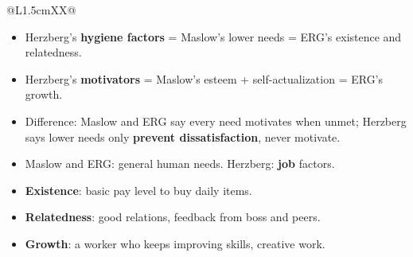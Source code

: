 {{\begin{tabularx}{\linewidth}{@{}L{1.5cm}XX@{}}
\bottomrule
\end{tabularx}}
\vspace{3pt}
\begin{itemize}
  \item Herzberg's \textbf{hygiene factors} = Maslow's lower needs = ERG's existence and
    relatedness.
  \item Herzberg's \textbf{motivators} = Maslow's esteem + self-actualization = ERG's growth.
  \item Difference: Maslow and ERG say every need motivates when unmet; Herzberg says lower
    needs only \textbf{prevent dissatisfaction}, never motivate.
  \item Maslow and ERG: general human needs. Herzberg: \textbf{job} factors.
\end{itemize}
\begin{itemize}
  \item \textbf{Existence}: basic pay level to buy daily items.
  \item \textbf{Relatedness}: good relations, feedback from boss and peers.
  \item \textbf{Growth}: a worker who keeps improving skills, creative work.
\end{itemize}}

